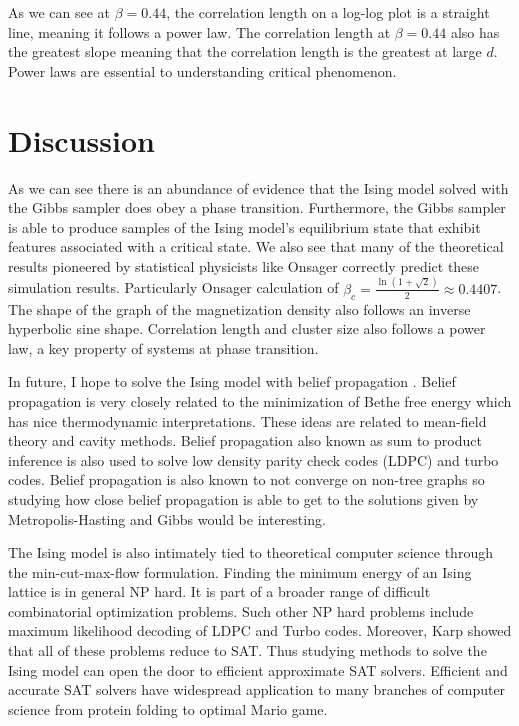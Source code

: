 \documentclass{article}
\begin{document}
As we can see at $\beta=0.44$, the correlation length on a log-log plot is a straight line, meaning it follows
a power law. The correlation length at $\beta = 0.44$ also has the greatest slope meaning that the correlation length
is the greatest at large $d$.
Power laws are essential to understanding critical phenomenon. 


\section{Discussion}
As we can see there is an abundance of evidence that the Ising model solved with the Gibbs sampler does obey a phase transition. Furthermore,
the Gibbs sampler is able to produce samples of the Ising model's equilibrium state that exhibit features associated with a critical state. 
We also see that many of the theoretical results pioneered by statistical physicists like Onsager correctly predict these simulation results. 
Particularly Onsager calculation of $\beta_c = \frac{\ln(1+\sqrt{2})}{2} \approx 0.4407 $. The shape of the graph of the magnetization density also 
follows an inverse hyperbolic sine shape. Correlation length and cluster size also follows a power law, a key property of systems at phase transition.

In future, I hope to solve the Ising model with belief propagation \cite{Koehler2019}. Belief propagation is very closely related to the minimization of Bethe free energy
which has nice thermodynamic interpretations. These ideas are related to mean-field theory and cavity methods. Belief propagation also known as sum to product inference is also used to solve low density parity check codes (LDPC)
and turbo codes. Belief propagation is also known to not converge on non-tree graphs so studying how close belief propagation is able to get to the solutions given 
by Metropolis-Hasting and Gibbs would be interesting.

The Ising model is also intimately tied to theoretical computer science through the min-cut-max-flow formulation. Finding the minimum
energy of an Ising lattice is in general NP hard. It is part of a broader range of difficult combinatorial optimization problems. Such other NP hard problems
include maximum likelihood decoding of LDPC and Turbo codes. Moreover, Karp showed that all of these problems reduce to SAT. Thus studying methods to solve the
Ising model can open the door to efficient approximate SAT solvers. Efficient and accurate SAT solvers have widespread application to many branches of computer science
from protein folding to optimal Mario game.
\end{document}

